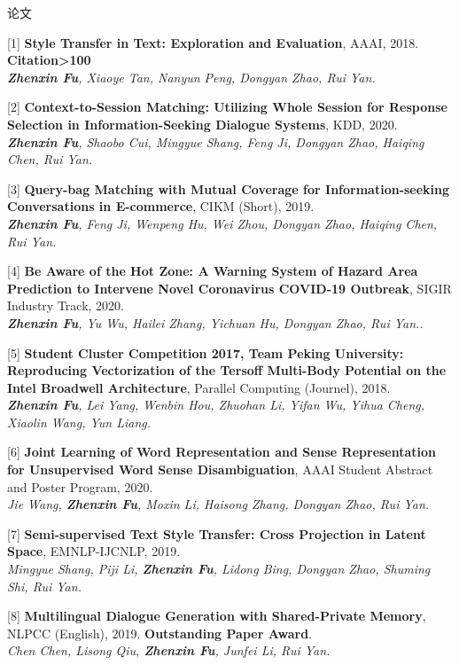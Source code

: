 \documentclass{resume} %
\begin{document}
\begin{rSection}{论文}
    
    [1] \textbf{Style Transfer in Text: Exploration and Evaluation}, AAAI, 2018. \textbf{Citation>100}\\
    {\it \textbf{Zhenxin Fu}, Xiaoye Tan, Nanyun Peng, Dongyan Zhao, Rui Yan.}
  
    [2] \textbf{Context-to-Session Matching: Utilizing Whole Session for Response Selection in Information-Seeking Dialogue Systems}, KDD, 2020. \\
    {\it \textbf{Zhenxin Fu}, Shaobo Cui, Mingyue Shang, Feng Ji, Dongyan Zhao, Haiqing Chen, Rui Yan.}
    
    [3] \textbf{Query-bag Matching with Mutual Coverage for Information-seeking Conversations in E-commerce}, CIKM (Short), 2019. \\
    {\it \textbf{Zhenxin Fu}, Feng Ji, Wenpeng Hu, Wei Zhou, Dongyan Zhao, Haiqing Chen, Rui Yan.}

    [4] \textbf{Be Aware of the Hot Zone: A Warning System of Hazard Area Prediction to Intervene Novel Coronavirus COVID-19 Outbreak}, SIGIR Industry Track, 2020. \\
    {\it \textbf{Zhenxin Fu}, Yu Wu, Hailei Zhang, Yichuan Hu, Dongyan Zhao, Rui Yan..}

    [5] \textbf{Student Cluster Competition 2017, Team Peking University: Reproducing Vectorization of the Tersoff Multi-Body Potential on the Intel Broadwell Architecture}, Parallel Computing (Journel), 2018. \\
    {\it \textbf{Zhenxin Fu}, Lei Yang, Wenbin Hou, Zhuohan Li, Yifan Wu, Yihua Cheng, Xiaolin Wang, Yun Liang.}

    [6] \textbf{Joint Learning of Word Representation and Sense Representation for Unsupervised Word Sense Disambiguation}, AAAI Student Abstract and Poster Program, 2020. \\
    {\it Jie Wang, \textbf{Zhenxin Fu}, Moxin Li, Haisong Zhang, Dongyan Zhao, Rui Yan.}

    [7] \textbf{Semi-supervised Text Style Transfer: Cross Projection in Latent Space}, EMNLP-IJCNLP, 2019. \\
    {\it Mingyue Shang, Piji Li, \textbf{Zhenxin Fu}, Lidong Bing, Dongyan Zhao, Shuming Shi, Rui Yan.}

    [8] \textbf{Multilingual Dialogue Generation with Shared-Private Memory}, NLPCC (English), 2019. \textbf{Outstanding Paper Award}. \\
    {\it Chen Chen, Lisong Qiu, \textbf{Zhenxin Fu}, Junfei Li, Rui Yan. }


\end{rSection}
\end{document}
